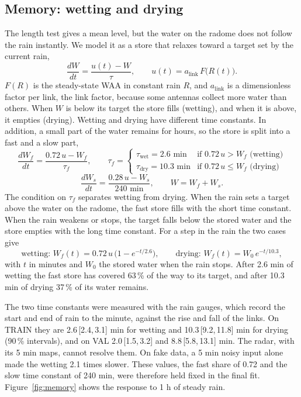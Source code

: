 \documentclass[11pt,a4paper]{article}
\newcommand{\alink}{a_{\mathrm{link}}}
\newcommand{\twet}{\tau_{\mathrm{wet}}}
\newcommand{\tdry}{\tau_{\mathrm{dry}}}
\newcommand{\iv}[2]{\,[#1,\,#2]}
\begin{document}
\subsection{Memory: wetting and drying}
The length test gives a mean level, but the water on the radome does not follow the rain instantly. We model it as a store
that relaxes toward a target set by the current rain,
\begin{equation}
\frac{dW}{dt} = \frac{u(t) - W}{\tau}, \qquad u(t) = \alink\,F\big(R(t)\big).
\label{eq:bucket}
\end{equation}
$F(R)$ is the steady-state WAA in constant rain $R$, and $\alink$ is a dimensionless factor per link, the link factor, because
some antennas collect more water than others. When $W$ is below its target the store fills (wetting), and when it is above, it
empties (drying). Wetting and drying have different time constants. In addition, a small part of the water remains for hours,
so the store is split into a fast and a slow part,
\begin{equation}
\frac{dW_f}{dt} = \frac{0.72\,u - W_f}{\tau_f}, \qquad
\tau_f = \begin{cases} \twet = 2.6 \text{ min} & \text{if } 0.72\,u > W_f \text{ (wetting)}\\
\tdry = 10.3 \text{ min} & \text{if } 0.72\,u \le W_f \text{ (drying)}\end{cases}
\label{eq:fast}
\end{equation}
\begin{equation}
\frac{dW_s}{dt} = \frac{0.28\,u - W_s}{240 \text{ min}}, \qquad W = W_f + W_s.
\label{eq:slow}
\end{equation}
The condition on $\tau_f$ separates wetting from drying. When the rain sets a target above the water on the radome, the fast
store fills with the short time constant. When the rain weakens or stops, the target falls below the stored water and the store
empties with the long time constant. For a step in the rain the two cases give
\begin{equation}
\text{wetting: } W_f(t) = 0.72\,u\,\big(1 - e^{-t/2.6}\big), \qquad \text{drying: } W_f(t) = W_0\,e^{-t/10.3},
\label{eq:jump}
\end{equation}
with $t$ in minutes and $W_0$ the stored water when the rain stops. After 2.6 min of wetting the fast store has covered 63\,\% of
the way to its target, and after 10.3 min of drying 37\,\% of its water remains.

The two time constants were measured with the rain gauges, which record the start and end of rain to the minute, against the
rise and fall of the links. On TRAIN they are 2.6\iv{2.4}{3.1} min for wetting and 10.3\iv{9.2}{11.8} min for drying (90\,\%
intervals), and on VAL 2.0\iv{1.5}{3.2} and 8.8\iv{5.8}{13.1} min. The radar, with its 5 min maps, cannot resolve them.
On fake data, a 5 min noisy input alone made the wetting 2.1 times slower. These values, the fast share of 0.72 and the slow time
constant of 240 min, were therefore held fixed in the final fit. Figure~\ref{fig:memory} shows the response to 1 h of steady rain.
\end{document}
